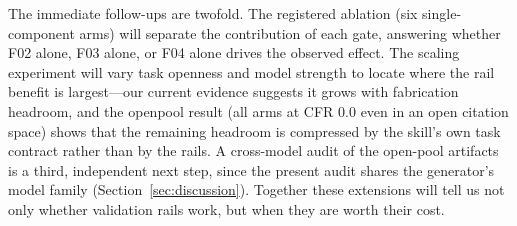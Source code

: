 \documentclass[10pt,twocolumn]{article}
\begin{document}
The immediate follow-ups are twofold. The registered ablation (six single-component arms) will separate the contribution of each gate, answering whether F02 alone, F03 alone, or F04 alone drives the observed effect. The scaling experiment will vary task openness and model strength to locate where the rail benefit is largest---our current evidence suggests it grows with fabrication headroom, and the openpool result (all arms at CFR $0.0$ even in an open citation space) shows that the remaining headroom is compressed by the skill's own task contract rather than by the rails. A cross-model audit of the open-pool artifacts is a third, independent next step, since the present audit shares the generator's model family (Section~\ref{sec:discussion}). Together these extensions will tell us not only whether validation rails work, but when they are worth their cost.



\end{document}

